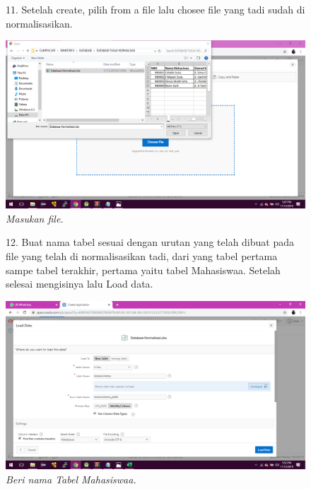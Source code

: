 \begin{enumerate}
\begin{figure}
\item[11.]Setelah create, pilih from a file lalu chosee file yang tadi sudah di normalisasikan.
    \begin{center}
    \includegraphics[scale=0.3]{figures/6.png}
    \caption{\textit{Masukan file.}}
     \end{center}
    \label{gambar}
    \end{figure}

\begin{figure}
\item[12.]Buat nama tabel sesuai dengan urutan yang telah dibuat pada file yang telah di normalisasikan tadi, dari yang tabel pertama sampe tabel terakhir, pertama yaitu tabel Mahasiswaa. Setelah selesai mengisinya lalu Load data.
    \begin{center}
    \includegraphics[scale=0.3]{figures/7.png}
    \caption{\textit{Beri nama Tabel Mahasiswaa.}}
    \end{center}
    \label{gambar}
    \end{figure}


\end{enumerate}

